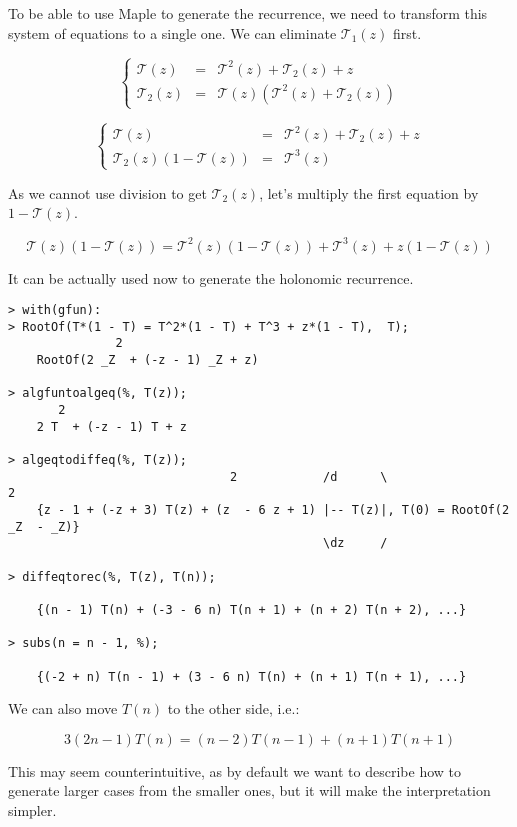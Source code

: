 \documentclass[final]{article}
\theoremstyle{definition}
\theoremstyle{remark}
\newcommand{\gf}[1]{\ensuremath{\mathcal{#1}}}
\begin{document}
To be able to use Maple to generate the recurrence, we need to transform this system of equations to a single one. We can eliminate \(\gf{T}_1(z)\) first.

\[\left\{\begin{array}{rcl}
            \gf{T}(z) &=& \gf{T}^2(z) + \gf{T}_2(z) + z\\
            \gf{T}_2(z) &=& \gf{T}(z)(\gf{T}^2(z) + \gf{T}_2(z))
\end{array}\right.\]

\[\left\{\begin{array}{rcl}
            \gf{T}(z) &=& \gf{T}^2(z) + \gf{T}_2(z) + z\\
            \gf{T}_2(z)(1 - \gf{T}(z)) &=& \gf{T}^3(z)
\end{array}\right.\]

As we cannot use division to get \(\gf{T}_2(z)\), let's multiply the first equation by \(1 - \gf{T}(z)\).

\[\gf{T}(z)(1 - \gf{T}(z)) = \gf{T}^2(z)(1 - \gf{T}(z)) + \gf{T}^3(z) + z(1 - \gf{T}(z))\]

It can be actually used now to generate the holonomic recurrence.

\begin{lstlisting}
> with(gfun):
> RootOf(T*(1 - T) = T^2*(1 - T) + T^3 + z*(1 - T),  T);
               2
    RootOf(2 _Z  + (-z - 1) _Z + z)

> algfuntoalgeq(%, T(z));
       2
    2 T  + (-z - 1) T + z

> algeqtodiffeq(%, T(z));
                               2            /d      \                    2
    {z - 1 + (-z + 3) T(z) + (z  - 6 z + 1) |-- T(z)|, T(0) = RootOf(2 _Z  - _Z)}
                                            \dz     /

> diffeqtorec(%, T(z), T(n));

    {(n - 1) T(n) + (-3 - 6 n) T(n + 1) + (n + 2) T(n + 2), ...}

> subs(n = n - 1, %);

    {(-2 + n) T(n - 1) + (3 - 6 n) T(n) + (n + 1) T(n + 1), ...}
\end{lstlisting}

We can also move \(T(n)\) to the other side, i.e.:

\[3 (2 n - 1) T(n) = (n - 2) T(n - 1) + (n + 1) T(n + 1)\]

This may seem counterintuitive, as by default we want to describe how to generate larger cases from the smaller ones, but it will make the interpretation simpler.
\end{document}
